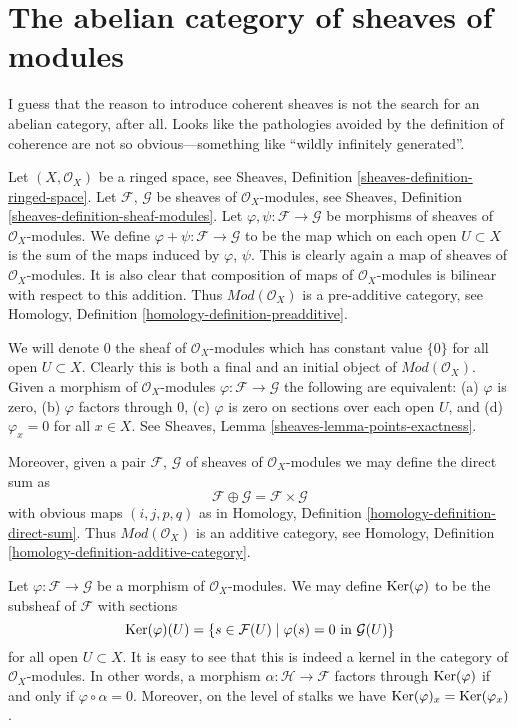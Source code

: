 \section{The abelian category of sheaves of modules}
\label{section-kernels}

\noindent
I guess that the reason to introduce
coherent sheaves is not the search for an
abelian category, after all.
Looks like the pathologies avoided
by the definition of coherence are not
so obvious---something like ``wildly infinitely generated''.

\medskip\noindent
Let $(X, \mathcal{O}_X)$ be a ringed space, see
Sheaves, Definition \ref{sheaves-definition-ringed-space}.
Let $\mathcal{F}$, $\mathcal{G}$ be sheaves of $\mathcal{O}_X$-modules, see
Sheaves, Definition \ref{sheaves-definition-sheaf-modules}.
Let $\varphi, \psi : \mathcal{F} \to \mathcal{G}$
be morphisms of sheaves of $\mathcal{O}_X$-modules.
We define $\varphi + \psi : \mathcal{F} \to \mathcal{G}$
to be the map which on each open $U \subset X$ is the
sum of the maps induced by $\varphi$, $\psi$. This is
clearly again a map of sheaves of $\mathcal{O}_X$-modules.
It is also clear that composition of maps of
$\mathcal{O}_X$-modules is bilinear with respect to this
addition. Thus $\textit{Mod}(\mathcal{O}_X)$ is a pre-additive
category, see Homology, Definition \ref{homology-definition-preadditive}.

\medskip\noindent
We will denote $0$ the sheaf of $\mathcal{O}_X$-modules
which has constant value $\{0\}$ for all open $U \subset X$.
Clearly this is both a final and an initial object of
$\textit{Mod}(\mathcal{O}_X)$. Given a morphism
of $\mathcal{O}_X$-modules $\varphi : \mathcal{F} \to \mathcal{G}$
the following are equivalent:
(a) $\varphi$ is zero, (b) $\varphi$ factors through $0$,
(c) $\varphi$ is zero on sections over each open $U$, and
(d) $\varphi_x = 0$ for all $x \in X$. See
Sheaves, Lemma \ref{sheaves-lemma-points-exactness}.

\medskip\noindent
Moreover, given a pair
$\mathcal{F}$, $\mathcal{G}$ of sheaves of $\mathcal{O}_X$-modules
we may define the direct sum as
$$
\mathcal{F} \oplus \mathcal{G} = \mathcal{F} \times \mathcal{G}
$$
with obvious maps $(i, j, p, q)$ as in Homology, Definition
\ref{homology-definition-direct-sum}. Thus $\textit{Mod}(\mathcal{O}_X)$
is an additive category, see
Homology, Definition \ref{homology-definition-additive-category}.

\medskip\noindent
Let $\varphi : \mathcal{F} \to \mathcal{G}$ be a morphism
of $\mathcal{O}_X$-modules. We may define $\mathop{\mathrm{Ker}}(\varphi)$
to be the subsheaf of $\mathcal{F}$ with sections
$$
\mathop{\mathrm{Ker}}(\varphi)(U) =
\{ s \in \mathcal{F}(U) \mid \varphi(s) = 0 \text{ in } \mathcal{G}(U)\}
$$
for all open $U \subset X$. It is easy to see that this is indeed
a kernel in the category of $\mathcal{O}_X$-modules. In other words,
a morphism $\alpha : \mathcal{H} \to \mathcal{F}$ factors
through $\mathop{\mathrm{Ker}}(\varphi)$ if and only if $\varphi \circ \alpha = 0$.
Moreover, on the level of stalks we have
$\mathop{\mathrm{Ker}}(\varphi)_x = \mathop{\mathrm{Ker}}(\varphi_x)$.

